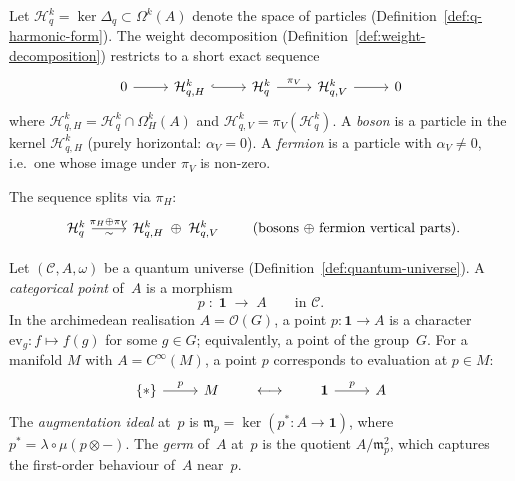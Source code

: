 \begin{definition}
\label{def:fermion}
\label{def:boson}
\leanok
Let $\mathcal{H}_q^k = \ker\Delta_q \subset \Omega^k(A)$ denote the
space of particles (Definition~\ref{def:q-harmonic-form}).  The weight
decomposition (Definition~\ref{def:weight-decomposition}) restricts to
a short exact sequence
\begin{equation}\label{eq:fermion-boson-ses}
\begin{tikzcd}[column sep=2.5em]
  0 \ar[r]
  & \mathcal{H}_{q,H}^k \ar[r, hook]
  & \mathcal{H}_q^k \ar[r, "\pi_V"]
  & \mathcal{H}_{q,V}^k \ar[r]
  & 0
\end{tikzcd}
\end{equation}
where $\mathcal{H}_{q,H}^k = \mathcal{H}_q^k \cap \Omega^k_H(A)$
and $\mathcal{H}_{q,V}^k = \pi_V(\mathcal{H}_q^k)$.  A \emph{boson}
is a particle in the kernel $\mathcal{H}_{q,H}^k$ (purely horizontal:
$\alpha_V = 0$).  A \emph{fermion} is a particle with
$\alpha_V \neq 0$, i.e.\ one whose image under $\pi_V$ is non-zero.

The sequence splits via $\pi_H$:
\begin{equation}\label{eq:fermion-boson-split}
\begin{tikzcd}[column sep=2.5em]
  \mathcal{H}_q^k
    \ar[r, "\pi_H \oplus \pi_V", "\sim"']
  & \mathcal{H}_{q,H}^k \;\oplus\; \mathcal{H}_{q,V}^k
\end{tikzcd}
\qquad
\text{(bosons $\oplus$ fermion vertical parts).}
\end{equation}
\end{definition}

\begin{definition}
\label{def:categorical-point}
Let $(\mathcal{C}, A, \omega)$ be a quantum universe
(Definition~\ref{def:quantum-universe}).  A \emph{categorical point}
of~$A$ is a morphism
\[
  p \;\colon\; \mathbf{1} \;\longrightarrow\; A
  \qquad\text{in } \mathcal{C}.
\]
In the archimedean realisation $A = \mathcal{O}(G)$, a point
$p \colon \mathbf{1} \to A$ is a character $\mathrm{ev}_g \colon f \mapsto f(g)$
for some $g \in G$; equivalently, a point of the group~$G$.  For a
manifold $M$ with $A = C^{\infty}(M)$, a point $p$ corresponds to
evaluation at $p \in M$:
\begin{equation}\label{eq:point-diagram}
\begin{tikzcd}[column sep=2.5em]
  \{*\} \ar[r, "p"]
  & M
\end{tikzcd}
\qquad\longleftrightarrow\qquad
\begin{tikzcd}[column sep=2.5em]
  \mathbf{1} \ar[r, "p"]
  & A
\end{tikzcd}
\end{equation}
The \emph{augmentation ideal} at~$p$ is
$\mathfrak{m}_p = \ker(p^* \colon A \to \mathbf{1})$, where
$p^* = \lambda \circ \mu(p \otimes -)$.  The \emph{germ} of~$A$
at~$p$ is the quotient $A / \mathfrak{m}_p^2$, which captures the
first-order behaviour of~$A$ near~$p$.
\end{definition}

